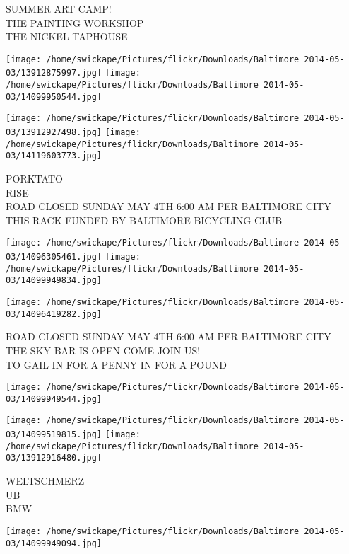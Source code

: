 \documentclass[10pt,letterpaper]{article}
\begin{document}
SUMMER ART CAMP!\\
THE PAINTING WORKSHOP\\
THE NICKEL TAPHOUSE\\
\pagebreak

\texttt{[image: /home/swickape/Pictures/flickr/Downloads/Baltimore 2014-05-03/13912875997.jpg]}
\texttt{[image: /home/swickape/Pictures/flickr/Downloads/Baltimore 2014-05-03/14099950544.jpg]}

\texttt{[image: /home/swickape/Pictures/flickr/Downloads/Baltimore 2014-05-03/13912927498.jpg]}
\texttt{[image: /home/swickape/Pictures/flickr/Downloads/Baltimore 2014-05-03/14119603773.jpg]}

PORKTATO\\
RISE\\
ROAD CLOSED SUNDAY MAY 4TH 6:00 AM PER BALTIMORE CITY\\
THIS RACK FUNDED BY BALTIMORE BICYCLING CLUB\\
\pagebreak

\texttt{[image: /home/swickape/Pictures/flickr/Downloads/Baltimore 2014-05-03/14096305461.jpg]}
\texttt{[image: /home/swickape/Pictures/flickr/Downloads/Baltimore 2014-05-03/14099949834.jpg]}

\texttt{[image: /home/swickape/Pictures/flickr/Downloads/Baltimore 2014-05-03/14096419282.jpg]}

ROAD CLOSED SUNDAY MAY 4TH 6:00 AM PER BALTIMORE CITY\\
THE SKY BAR IS OPEN COME JOIN US!\\
TO GAIL IN FOR A PENNY IN FOR A POUND\\
\pagebreak

\texttt{[image: /home/swickape/Pictures/flickr/Downloads/Baltimore 2014-05-03/14099949544.jpg]}

\vspace{0.25in}
\texttt{[image: /home/swickape/Pictures/flickr/Downloads/Baltimore 2014-05-03/14099519815.jpg]}
\texttt{[image: /home/swickape/Pictures/flickr/Downloads/Baltimore 2014-05-03/13912916480.jpg]}

WELTSCHMERZ\\
UB\\
BMW\\
\pagebreak

\texttt{[image: /home/swickape/Pictures/flickr/Downloads/Baltimore 2014-05-03/14099949094.jpg]}
\end{document}

